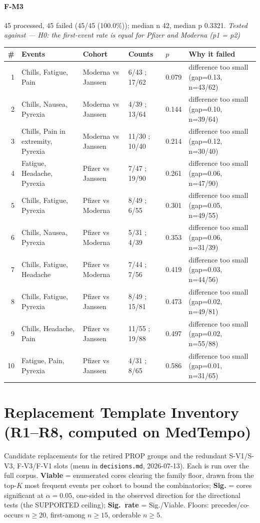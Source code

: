 \documentclass[11pt]{article}
\begin{document}
\paragraph{F-M3} 45 processed, 45 failed (45/45 (100.0\%)); median n 42, median p 0.3321. \emph{Tested against --- H0: the first-event rate is equal for Pfizer and Moderna (p1 = p2)} \\
\begin{longtable}{@{}r p{3.9cm} p{2.5cm} l l p{4.4cm}@{}}
\toprule
\# & Events & Cohort & Counts & $p$ & Why it failed \\
\midrule \endhead
1 & Chills, Fatigue, Pain & Moderna vs Janssen & 6/43 ; 17/62 & 0.079 & difference too small (gap=0.13, n=43/62) \\
2 & Chills, Nausea, Pyrexia & Moderna vs Janssen & 4/39 ; 13/64 & 0.144 & difference too small (gap=0.10, n=39/64) \\
3 & Chills, Pain in extremity, Pyrexia & Moderna vs Janssen & 11/30 ; 10/40 & 0.214 & difference too small (gap=0.12, n=30/40) \\
4 & Fatigue, Headache, Pyrexia & Pfizer vs Janssen & 7/47 ; 19/90 & 0.261 & difference too small (gap=0.06, n=47/90) \\
5 & Chills, Fatigue, Pyrexia & Pfizer vs Moderna & 8/49 ; 6/55 & 0.301 & difference too small (gap=0.05, n=49/55) \\
6 & Chills, Nausea, Pyrexia & Pfizer vs Moderna & 5/31 ; 4/39 & 0.353 & difference too small (gap=0.06, n=31/39) \\
7 & Chills, Fatigue, Headache & Pfizer vs Moderna & 7/44 ; 7/56 & 0.419 & difference too small (gap=0.03, n=44/56) \\
8 & Chills, Fatigue, Pyrexia & Pfizer vs Janssen & 8/49 ; 15/81 & 0.473 & difference too small (gap=0.02, n=49/81) \\
9 & Chills, Headache, Pain & Pfizer vs Janssen & 11/55 ; 19/88 & 0.497 & difference too small (gap=0.02, n=55/88) \\
10 & Fatigue, Pain, Pyrexia & Pfizer vs Janssen & 4/31 ; 8/65 & 0.586 & difference too small (gap=0.01, n=31/65) \\
\bottomrule
\end{longtable}

\section{Replacement Template Inventory (R1--R8, computed on MedTempo)}
Candidate replacements for the retired PROP groups and the redundant S-V1/S-V3, F-V3/F-V1 slots (menu in \texttt{decisions.md}, 2026-07-13). Each is run over the full corpus. \textbf{Viable} = enumerated cores clearing the family floor, drawn from the top-$K$ most frequent events per cohort to bound the combinatorics; \textbf{Sig.} = cores significant at $\alpha=0.05$, one-sided in the observed direction for the directional tests (the SUPPORTED ceiling); \textbf{Sig.\ rate} = Sig./Viable. Floors: precedes/co-occurs $n\geq20$, first-among $n\geq15$, orderable $n\geq5$.
\end{document}
